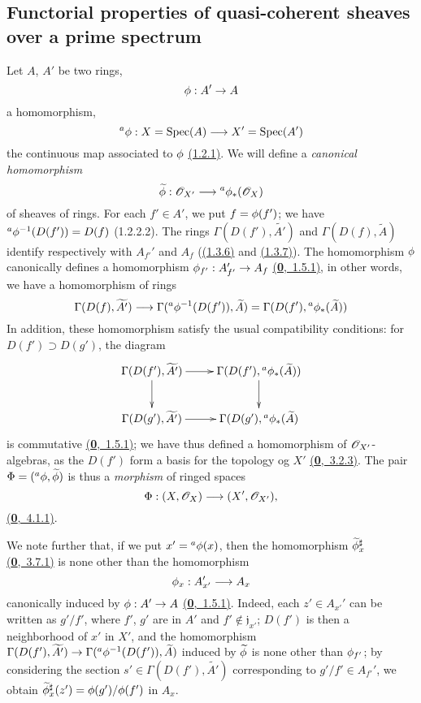 \subsection{Functorial properties of quasi-coherent sheaves over a prime spectrum}
\label{subsection-func-prop-qcoh-over-spec}

\begin{env}[1.6.1]
\label{env-1.1.6.1}
Let $A$, $A'$ be two rings,
\[
  \phi:A'\to A
\]
a homomorphism,
\[
  {}^a\phi:X={\mathop{\mathrm{Spec}}\nolimits}(A)\longrightarrow X'={\mathop{\mathrm{Spec}}\nolimits}(A')
\]
the continuous map associated to $\phi$ \hyperref[env-1.1.2.1]{(1.2.1)}. We will define a {\em canonical
homomorphism}
\[
  \widetilde{\phi}:\mathscr{O}_{X'}\longrightarrow{}^a\phi_*(\mathscr{O}_X)
\]
of sheaves of rings. For each $f'\in A'$, we put $f=\phi(f')$; we have
${}^a\phi^{-1}(D(f'))=D(f)$ (1.2.2.2). The rings $\Gamma(D(f'),\widetilde{A'})$ and
$\Gamma(D(f),\widetilde{A})$ identify respectively with $A_{f'}'$ and $A_f$
(\hyperref[prop-1.1.3.6]{(1.3.6)} and \hyperref[thm-1.1.3.7]{(1.3.7)}). The homomorphism $\phi$ canonically defines a
homomorphism $\phi_{f'}:A_{f'}'\to A_f$ \hyperref[env-0.1.5.1]{(\textbf{0},~1.5.1)}, in other words, we have a
homomorphism of rings
\[
  \Gamma(D(f),\widetilde{A'})\longrightarrow\Gamma({}^a\phi^{-1}(D(f')),\widetilde{A})
  =\Gamma(D(f'),{}^a\phi_*(\widetilde{A}))
\]
In addition, these homomorphism satisfy the usual compatibility conditions: for
$D(f')\supset D(g')$, the diagram
\[
  \xymatrix{
    \Gamma(D(f'),\widetilde{A'})\ar[r]\ar[d] &
    \Gamma(D(f'),{}^a\vphi_*(\widetilde{A}))\ar[d]\\
    \Gamma(D(g'),\widetilde{A'})\ar[r] &
    \Gamma(D(g'),{}^a\vphi_*(\widetilde{A})
  }
\]
is commutative \hyperref[env-0.1.5.1]{(\textbf{0},~1.5.1)}; we have thus defined a homomorphism of $\mathscr{O}_{X'}$-algebras,
as the $D(f')$ form a basis for the topology og $X'$ \hyperref[env-0.3.2.3]{(\textbf{0},~3.2.3)}. The pair
$\Phi=({}^a\phi,\widetilde{\phi})$ is thus a {\em morphism} of ringed spaces
\[
  \Phi:(X,\mathscr{O}_X)\longrightarrow(X',\mathscr{O}_{X'}),
\]
\hyperref[env-0.4.1.1]{(\textbf{0},~4.1.1)}.

We note further that, if we put $x'={}^a\phi(x)$, then the homomorphism
$\widetilde{\phi}_x^\sharp$ \hyperref[env-0.3.7.1]{(\textbf{0},~3.7.1)} is none other than the homomorphism
\[
  \phi_x:A_{x'}'\longrightarrow A_x
\]
canonically induced by $\phi:A'\to A$ \hyperref[env-0.1.5.1]{(\textbf{0},~1.5.1)}. Indeed, each $z'\in A_{x'}'$
can be written as $g'/f'$, where $f'$, $g'$ are in $A'$ and $f'\not\in\mathfrak{j}_{x'}$;
$D(f')$ is then a neighborhood of $x'$ in $X'$, and the homomorphism
$\Gamma(D(f'),\widetilde{A'})\to\Gamma({}^a\phi^{-1}(D(f')),\widetilde{A})$ induced by
$\widetilde{\phi}$ is none other than $\phi_{f'}$; by considering the section
$s'\in\Gamma(D(f'),\widetilde{A'})$ corresponding to $g'/f'\in A_{f'}'$, we obtain
$\widetilde{\phi}_x^\sharp(z')=\phi(g')/\phi(f')$ in $A_x$.
\end{env}

